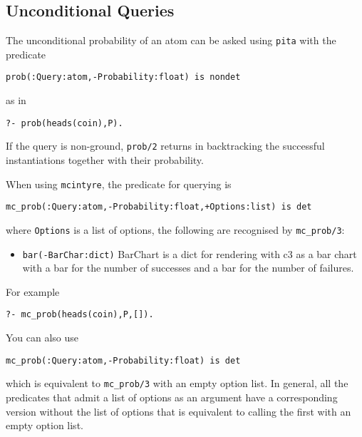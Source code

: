 \subsection{Unconditional Queries}
\label{uncondq}
The unconditional probability of an atom can be asked using \verb|pita| with the predicate
\begin{verbatim}
prob(:Query:atom,-Probability:float) is nondet
\end{verbatim}
as in
\begin{verbatim}
?- prob(heads(coin),P).
\end{verbatim}
If the query is non-ground, \verb|prob/2| returns in backtracking the successful instantiations together with their probability.

When using \verb|mcintyre|, the predicate for querying is
\begin{verbatim}
mc_prob(:Query:atom,-Probability:float,+Options:list) is det
\end{verbatim} where
\verb|Options| is a list of options, the following are recognised by \verb|mc_prob/3|:
\begin{itemize}
\item \verb|bar(-BarChar:dict)|
BarChart is a dict for rendering with c3 as a bar chart with
a bar for the number of successes and a bar for the number
of failures.
\end{itemize}
For example
\begin{verbatim}
?- mc_prob(heads(coin),P,[]).
\end{verbatim}
You can also use
\begin{verbatim}
mc_prob(:Query:atom,-Probability:float) is det
\end{verbatim}
which is equivalent to \verb|mc_prob/3| with an empty option list. In general, all the predicates that admit
a list of options as an argument have a corresponding version without the list of options that is equivalent
to calling the first with an empty option list.

